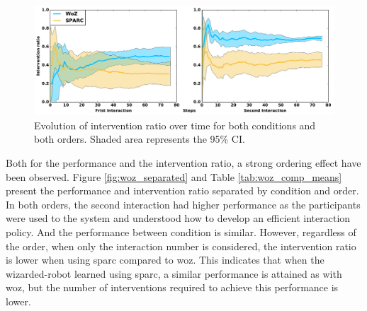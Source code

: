 \begin{figure}[ht]
	\centering
	\includegraphics[width=1.\textwidth]{./images/woz_ratio_time.pdf}
	\caption{Evolution of intervention ratio over time for both conditions and both orders. Shaded area represents the 95\% CI.}
	\label{fig:woz_ratio_time}
\end{figure}

Both for the performance and the intervention ratio, a strong ordering effect have been observed. Figure \ref{fig:woz_separated} and Table \ref{tab:woz_comp_means} present the performance and intervention ratio separated by condition and order. In both orders, the second interaction had higher performance as the participants were used to the system and understood how to develop an efficient interaction policy. And the performance between condition is similar. However, regardless of the order, when only the interaction number is considered, the intervention ratio is lower when using \gls{sparc} compared to \gls{woz}. This indicates that when the wizarded-robot learned using \gls{sparc}, a similar performance is attained as with \gls{woz}, but the number of interventions required to achieve this performance is lower.


